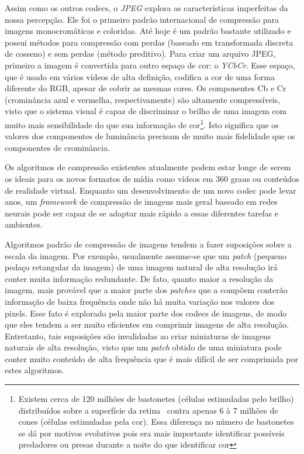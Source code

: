 Assim como os outros codecs, o \textit{JPEG} explora as características imperfeitas da nossa percepção. Ele foi o primeiro padrão internacional de compressão para imagens monocromáticas e coloridas. Até hoje é um padrão bastante utilizado e possui métodos para compressão com perdas (baseado em transformada discreta de cosseno) e sem perdas (método preditivo). Para criar um arquivo JPEG, primeiro a imagem é convertida para outro espaço de cor: o \textit{YCbCr}. Esse espaço, que é usado em vários vídeos de alta definição, codifica a cor de uma forma diferente do RGB, apesar de cobrir as mesmas cores. Os componentes Cb e Cr (crominância azul e vermelha, respectivamente) são altamente compressíveis, visto que o sistema visual é capaz de discriminar o brilho de uma imagem com muito mais sensibilidade do que sua informação de cor\footnote{Existem cerca de 120 milhões de bastonetes (células estimuladas pelo brilho) distribuídos sobre a superfície da retina~\cite{olho} contra apenas 6 à 7 milhões de cones (células estimuladas pela cor). Essa diferença no número de bastonetes se dá por motivos evolutivos pois era mais importante identificar possíveis predadores ou presas durante a noite do que identificar cor}. Isto significa que os valores dos componentes de luminância precisam de muito mais fidelidade que os componentes de crominância.

Os algoritmos de compressão existentes atualmente podem estar longe de serem os ideais para os novos formatos de mídia como vídeos em 360 graus ou conteúdos de realidade virtual. Enquanto um desenvolvimento de um novo codec pode levar anos, um \textit{framework} de compressão de imagens mais geral baseado em redes neurais pode ser capaz de se adaptar mais rápido a essas diferentes tarefas e ambientes.

Algoritmos padrão de compressão de imagens tendem a fazer suposições sobre a escala da imagem. Por exemplo, usualmente assume-se que um \textit{patch} (pequeno pedaço retangular da imagem) de uma imagem natural de alta resolução irá conter muita informação redundante. De fato, quanto maior a resolução da imagem, mais provável que a maior parte dos \textit{patches} que a compõem conterão informação de baixa frequência onde não há muita variação nos valores dos pixels. Esse fato é explorado pela maior parte dos codecs de imagens, de modo que eles tendem a ser muito eficientes em comprimir imagens de alta resolução. Entretanto, tais suposições são invalidadas ao criar miniaturas de imagens naturais de alta resolução, visto que um \textit{patch} obtido de uma miniatura pode conter muito conteúdo de alta frequência que é mais difícil de ser comprimida por estes algoritmos. 

